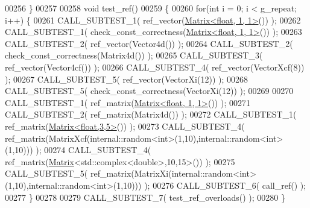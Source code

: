 \begin{DoxyCode}
00256 \}
00257 
00258 \textcolor{keywordtype}{void} test\_ref()
00259 \{
00260   \textcolor{keywordflow}{for}(\textcolor{keywordtype}{int} i = 0; i < g\_repeat; i++) \{
00261     CALL\_SUBTEST\_1( ref\_vector(\hyperlink{group___core___module_class_eigen_1_1_matrix}{Matrix<float, 1, 1>}()) );
00262     CALL\_SUBTEST\_1( check\_const\_correctness(\hyperlink{group___core___module_class_eigen_1_1_matrix}{Matrix<float, 1, 1>}()) );
00263     CALL\_SUBTEST\_2( ref\_vector(Vector4d()) );
00264     CALL\_SUBTEST\_2( check\_const\_correctness(Matrix4d()) );
00265     CALL\_SUBTEST\_3( ref\_vector(Vector4cf()) );
00266     CALL\_SUBTEST\_4( ref\_vector(VectorXcf(8)) );
00267     CALL\_SUBTEST\_5( ref\_vector(VectorXi(12)) );
00268     CALL\_SUBTEST\_5( check\_const\_correctness(VectorXi(12)) );
00269 
00270     CALL\_SUBTEST\_1( ref\_matrix(\hyperlink{group___core___module_class_eigen_1_1_matrix}{Matrix<float, 1, 1>}()) );
00271     CALL\_SUBTEST\_2( ref\_matrix(Matrix4d()) );
00272     CALL\_SUBTEST\_1( ref\_matrix(\hyperlink{group___core___module_class_eigen_1_1_matrix}{Matrix<float,3,5>}()) );
00273     CALL\_SUBTEST\_4( ref\_matrix(MatrixXcf(internal::random<int>(1,10),internal::random<int>(1,10))) );
00274     CALL\_SUBTEST\_4( ref\_matrix(\hyperlink{group___core___module_class_eigen_1_1_matrix}{Matrix}<std::complex<double>,10,15>()) );
00275     CALL\_SUBTEST\_5( ref\_matrix(MatrixXi(internal::random<int>(1,10),internal::random<int>(1,10))) );
00276     CALL\_SUBTEST\_6( call\_ref() );
00277   \}
00278   
00279   CALL\_SUBTEST\_7( test\_ref\_overloads() );
00280 \}
\end{DoxyCode}
